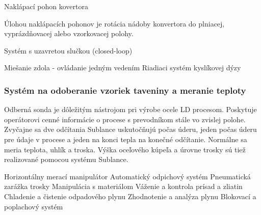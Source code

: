 \documentclass[]{tukediphc}
\begin{document}
Naklápací pohon kovertora

Úlohou naklápacích pohonov je rotácia nádoby konvertora do plniacej, vyprázdňovacej alebo vzorkovacej polohy.

Systém s uzavretou slučkou (closed-loop)



Miešanie zdola - ovládanie jedným vedením
Riadiaci systém kyslíkovej dýzy

\subsubsection{Systém na odoberanie vzoriek taveniny a meranie teploty}


Odberná sonda je dôležitým nástrojom pri výrobe ocele LD procesom. Poskytuje operátorovi cenné informácie o procese s prevodníkom stále vo zvislej polohe. Zvyčajne sa dve odčítania Sublance uskutočňujú počas úderu, jeden počas úderu pre údaje v procese a jeden na konci tepla na konečné odčítanie. Normálne sa meria teplota, uhlík a troska. Výška oceľového kúpeľa a úrovne trosky sú tiež realizované pomocou systému Sublance.


Horizontálny merací manipulátor
Automatický odpichový systém
Pneumatická zarážka trosky
Manipulácia s materiálom
Váženie a kontrola prísad a zliatin
Chladenie a čistenie odpadového plynu
Zhodnotenie a analýza plynu
Blokovací a poplachový systém



%

%
\end{document}
